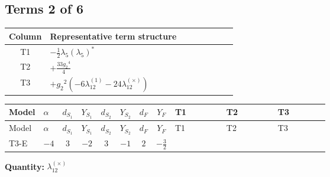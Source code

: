 \documentclass[8pt]{article}
\begin{document}
\begin{landscape}
\subsection*{Terms 2 of 6}
\begin{center}
\begin{tabular}{@{}c >{\raggedright\arraybackslash}p{0.82\linewidth}@{}}
\toprule
Column & Representative term structure \\
\midrule
T1 & \(\displaystyle -\frac{1}{2} {\lambda_5} \left({\lambda_5}\right)^{*}\) \\
\midrule
T2 & \(\displaystyle +\frac{33 {g_2}^4}{4}\) \\
\midrule
T3 & \(\displaystyle +{g_2}^2 (-6 {\lambda_{12}^{(1)}}-24 {\lambda_{12}^{(\times)}})\) \\
\midrule
\bottomrule
\end{tabular}
\end{center}
\smallskip
\tiny
\begin{longtable}{@{}llcccccc >{\raggedright\arraybackslash}p{0.21\linewidth} >{\raggedright\arraybackslash}p{0.21\linewidth} >{\raggedright\arraybackslash}p{0.21\linewidth}@{}}
\toprule
Model & $\alpha$ & $d_{S_1}$ & $Y_{S_1}$ & $d_{S_2}$ & $Y_{S_2}$ & $d_F$ & $Y_F$ & T1 & T2 & T3 \\
\midrule
\endfirsthead
\toprule
Model & $\alpha$ & $d_{S_1}$ & $Y_{S_1}$ & $d_{S_2}$ & $Y_{S_2}$ & $d_F$ & $Y_F$ & T1 & T2 & T3 \\
\midrule
\endhead
T3-E & $-4$ & $3$ & $-2$ & $3$ & $-1$ & $2$ & $-\frac{3}{2}$ & \scriptsize\adjustbox{max width=\linewidth}{$\begin{gathered} -\frac{1}{2} {\lambda_5} \left({\lambda_5}\right)^{*}\end{gathered}$} & \scriptsize\adjustbox{max width=\linewidth}{$\begin{gathered} +\frac{33 {g_2}^4}{4}\end{gathered}$} & \scriptsize\adjustbox{max width=\linewidth}{$\begin{gathered} +{g_2}^2 (-6 {\lambda_{12}^{(1)}}-24 {\lambda_{12}^{(\times)}})\end{gathered}$} \\
\midrule
\bottomrule
\end{longtable}
\clearpage
\noindent\textbf{Quantity: }$\lambda_{12}^{(\times)}$\par\smallskip

\end{landscape}
\end{document}
